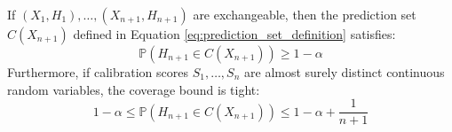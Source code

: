 


\begin{theorem}
\label{thm: marginal coverage}
If $(X_1, H_1), \dots, (X_{n+1}, H_{n+1})$ are exchangeable, then the prediction set $C(X_{n+1})$ defined in 
Equation \ref{eq:prediction_set_definition} satisfies:
\begin{equation*}
\mathbb{P}\left( H_{n+1} \in C(X_{n+1}) \right) \ge 1 - \alpha
\end{equation*}
Furthermore, if calibration scores $S_1, \dots, S_n$ are almost surely distinct continuous random variables, the coverage 
bound is tight:
\begin{equation}
1 - \alpha \le \mathbb{P}\left( H_{n+1} \in C(X_{n+1}) \right) \le 1 - \alpha + \frac{1}{n+1}
\end{equation}
\end{theorem}



